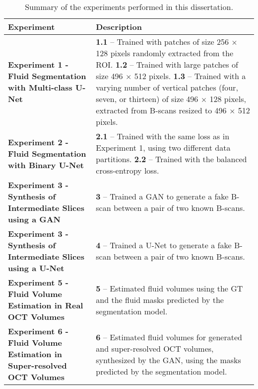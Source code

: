 \begin{table}[H]
	\centering
	\caption{Summary of the experiments performed in this dissertation.}
	\begin{tabular}{|p{7cm}|p{7cm}|}
		\hline
		\textbf{Experiment} & \textbf{Description} \\
		\hline
		\textbf{Experiment 1 - Fluid Segmentation with Multi-class U-Net} &
		\textbf{1.1} – Trained with patches of size 256 $\times$ 128 pixels randomly extracted from the ROI. \newline
		\textbf{1.2} – Trained with large patches of size 496 $\times$ 512 pixels. \newline
		\textbf{1.3} – Trained with a varying number of vertical patches (four, seven, or thirteen) of size 496 $\times$ 128 pixels, extracted from B-scans resized to 496 $\times$ 512 pixels. \\
		\hline
		\textbf{Experiment 2 - Fluid Segmentation with Binary U-Net} & \textbf{2.1} – Trained with the same loss as in Experiment 1, using two different data partitions. \newline
		\textbf{2.2} – Trained with the balanced cross-entropy loss. \\
		\hline
		\textbf{Experiment 3 - Synthesis of Intermediate Slices using a GAN} &
		\textbf{3} – Trained a GAN to generate a fake B-scan between a pair of two known B-scans. \\
		\hline
		\textbf{Experiment 3 - Synthesis of Intermediate Slices using a U-Net} &
		\textbf{4} – Trained a U-Net to generate a fake B-scan between a pair of two known B-scans. \\
		\hline
		\textbf{Experiment 5 - Fluid Volume Estimation in Real OCT Volumes} &
		\textbf{5} – Estimated fluid volumes using the GT and the fluid masks predicted by the segmentation model. \\
		\hline
		\textbf{Experiment 6 - Fluid Volume Estimation in Super-resolved OCT Volumes} &
		\textbf{6} – Estimated fluid volumes for generated and super-resolved OCT volumes, synthesized by the GAN, using the masks predicted by the segmentation model. \\
		\hline
	\end{tabular}
	\label{tab:ExperimentsSummary}
\end{table}
